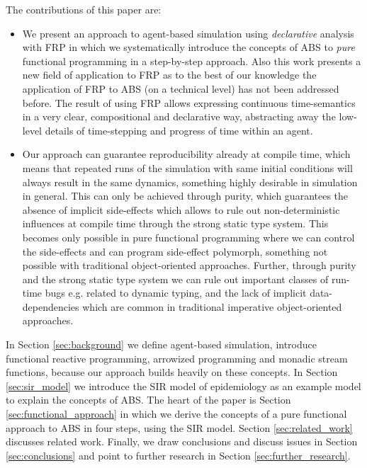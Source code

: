The contributions of this paper are:
\begin{itemize}
	\item We present an approach to agent-based simulation using \textit{declarative} analysis with FRP in which we systematically introduce the concepts of ABS to \textit{pure} functional programming in a step-by-step approach. Also this work presents a new field of application to FRP as to the best of our knowledge the application of FRP to ABS (on a technical level) has not been addressed before. The result of using FRP allows expressing continuous time-semantics in a very clear, compositional and declarative way, abstracting away the low-level details of time-stepping and progress of time within an agent.
	
	\item Our approach can guarantee reproducibility already at compile time, which means that repeated runs of the simulation with same initial conditions will always result in the same dynamics, something highly desirable in simulation in general. This can only be achieved through purity, which guarantees the absence of implicit side-effects which allows to rule out non-deterministic influences at compile time through the strong static type system. This becomes only possible in pure functional programming where we can control the side-effects and can program side-effect polymorph, something not possible with traditional object-oriented approaches. Further, through purity and the strong static type system we can rule out important classes of run-time bugs e.g. related to dynamic typing, and the lack of implicit data-dependencies which are common in traditional imperative object-oriented approaches.
\end{itemize}

In Section \ref{sec:background} we define agent-based simulation, introduce functional reactive programming, arrowized programming and monadic stream functions, because our approach builds heavily on these concepts. In Section \ref{sec:sir_model} we introduce the SIR model of epidemiology as an example model to explain the concepts of ABS. The heart of the paper is Section \ref{sec:functional_approach} in which we derive the concepts of a pure functional approach to ABS in four steps, using the SIR model. Section \ref{sec:related_work} discusses related work. Finally, we draw conclusions and discuss issues in Section \ref{sec:conclusions} and point to further research in Section \ref{sec:further_research}.

